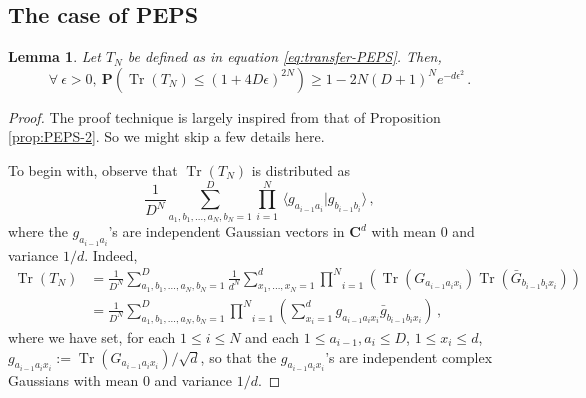 \documentclass{amsart}
\newtheorem{lemma}[theorem]{Lemma}
\newcommand{\C}{\mathbf{C}}
\renewcommand{\P}{\mathbf{P}}
\renewcommand{\leq}{\leqslant}
\renewcommand{\geq}{\geqslant}
\DeclareMathOperator{\Tr}{Tr}
\newcommand{\braket}[2]{\langle #1 | #2\rangle}
\begin{document}
\subsection{The case of PEPS} \hfill\par\smallskip
\label{sec:decay-correlations-2-PEPS}

\begin{lemma} \label{lem:trace-T_N}
    Let $T_N$ be defined as in equation \eqref{eq:transfer-PEPS}. Then,
    \[ \forall\ \epsilon>0,\ \P\left( \Tr (T_N) \leq (1+4D\epsilon)^{2N} \right) \geq 1-2N(D+1)^Ne^{-d\epsilon^2} \, . \]
\end{lemma}

\begin{proof}
    The proof technique is largely inspired from that of Proposition \ref{prop:PEPS-2}. So we might skip a few details here.

    To begin with, observe that $\Tr(T_N)$ is distributed as
    \[ \frac{1}{D^N} \sum_{a_1,b_1,\ldots,a_N,b_N=1}^D \underset{i=1}{\overset{N}{\prod}}\, \braket{g_{a_{i-1}a_i}}{g_{b_{i-1}b_i}} \, , \]
    where the $g_{a_{i-1}a_i}$'s are independent Gaussian vectors in $\C^d$ with mean $0$ and variance $1/d$. Indeed,
    \begin{align*}
        \Tr(T_N) & = \frac{1}{D^N} \sum_{a_1,b_1,\ldots,a_N,b_N=1}^D \frac{1}{d^N} \sum_{x_1,\ldots,x_N=1}^d \underset{i=1}{\overset{N}{\prod}} \left( \Tr(G_{a_{i-1}a_ix_i})\Tr(\bar{G}_{b_{i-1}b_ix_i}) \right) \\
                 & = \frac{1}{D^N} \sum_{a_1,b_1,\ldots,a_N,b_N=1}^D \underset{i=1}{\overset{N}{\prod}} \left( \sum_{x_i=1}^d g_{a_{i-1}a_ix_i}\bar{g}_{b_{i-1}b_ix_i} \right) \, ,
    \end{align*}
    where we have set, for each $1\leq i\leq N$ and each $1\leq a_{i-1},a_i\leq D$, $1\leq x_i\leq d$, $g_{a_{i-1}a_ix_i}:= \Tr(G_{a_{i-1}a_ix_i})/\sqrt{d}$, so that the $g_{a_{i-1}a_ix_i}$'s are independent complex Gaussians with mean $0$ and variance $1/d$.


\end{proof}
\end{document}
